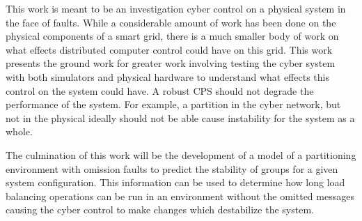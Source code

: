 This work is meant to be an investigation cyber control on a physical system in
the face of faults. While a considerable amount of work has been done on the
physical components of a smart grid, there is a much smaller body of work on what
effects distributed computer control could have on this grid. This work presents
the ground work for greater work involving testing the cyber system with both simulators
and physical hardware to understand what effects this control on the system could have.
A robust CPS should not degrade the performance of the system. For example, a partition
in the cyber network, but not in the physical ideally should not be able cause instability
for the system as a whole.

The culmination of this work will be the development of a model of a partitioning
environment with omission faults to predict the stability of groups for a given system
configuration. This information can be used to determine how long load balancing operations
can be run in an environment without the omitted messages causing the cyber control to
make changes which destabilize the system.
